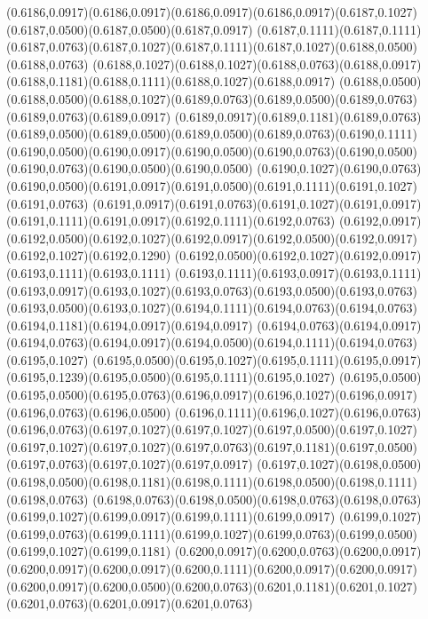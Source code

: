 (0.6186,0.0917)(0.6186,0.0917)(0.6186,0.0917)(0.6186,0.0917)(0.6187,0.1027)(0.6187,0.0500)(0.6187,0.0500)(0.6187,0.0917)
(0.6187,0.1111)(0.6187,0.1111)(0.6187,0.0763)(0.6187,0.1027)(0.6187,0.1111)(0.6187,0.1027)(0.6188,0.0500)(0.6188,0.0763)
(0.6188,0.1027)(0.6188,0.1027)(0.6188,0.0763)(0.6188,0.0917)(0.6188,0.1181)(0.6188,0.1111)(0.6188,0.1027)(0.6188,0.0917)
(0.6188,0.0500)(0.6188,0.0500)(0.6188,0.1027)(0.6189,0.0763)(0.6189,0.0500)(0.6189,0.0763)(0.6189,0.0763)(0.6189,0.0917)
(0.6189,0.0917)(0.6189,0.1181)(0.6189,0.0763)(0.6189,0.0500)(0.6189,0.0500)(0.6189,0.0500)(0.6189,0.0763)(0.6190,0.1111)
(0.6190,0.0500)(0.6190,0.0917)(0.6190,0.0500)(0.6190,0.0763)(0.6190,0.0500)(0.6190,0.0763)(0.6190,0.0500)(0.6190,0.0500)
(0.6190,0.1027)(0.6190,0.0763)(0.6190,0.0500)(0.6191,0.0917)(0.6191,0.0500)(0.6191,0.1111)(0.6191,0.1027)(0.6191,0.0763)
(0.6191,0.0917)(0.6191,0.0763)(0.6191,0.1027)(0.6191,0.0917)(0.6191,0.1111)(0.6191,0.0917)(0.6192,0.1111)(0.6192,0.0763)
(0.6192,0.0917)(0.6192,0.0500)(0.6192,0.1027)(0.6192,0.0917)(0.6192,0.0500)(0.6192,0.0917)(0.6192,0.1027)(0.6192,0.1290)
(0.6192,0.0500)(0.6192,0.1027)(0.6192,0.0917)(0.6193,0.1111)(0.6193,0.1111)
\PST@Solid(0.6193,0.1111)(0.6193,0.0917)(0.6193,0.1111)(0.6193,0.0917)(0.6193,0.1027)(0.6193,0.0763)(0.6193,0.0500)(0.6193,0.0763)
(0.6193,0.0500)(0.6193,0.1027)(0.6194,0.1111)(0.6194,0.0763)(0.6194,0.0763)(0.6194,0.1181)(0.6194,0.0917)(0.6194,0.0917)
(0.6194,0.0763)(0.6194,0.0917)(0.6194,0.0763)(0.6194,0.0917)(0.6194,0.0500)(0.6194,0.1111)(0.6194,0.0763)(0.6195,0.1027)
(0.6195,0.0500)(0.6195,0.1027)(0.6195,0.1111)(0.6195,0.0917)(0.6195,0.1239)(0.6195,0.0500)(0.6195,0.1111)(0.6195,0.1027)
(0.6195,0.0500)(0.6195,0.0500)(0.6195,0.0763)(0.6196,0.0917)(0.6196,0.1027)(0.6196,0.0917)(0.6196,0.0763)(0.6196,0.0500)
(0.6196,0.1111)(0.6196,0.1027)(0.6196,0.0763)(0.6196,0.0763)(0.6197,0.1027)(0.6197,0.1027)(0.6197,0.0500)(0.6197,0.1027)
(0.6197,0.1027)(0.6197,0.1027)(0.6197,0.0763)(0.6197,0.1181)(0.6197,0.0500)(0.6197,0.0763)(0.6197,0.1027)(0.6197,0.0917)
(0.6197,0.1027)(0.6198,0.0500)(0.6198,0.0500)(0.6198,0.1181)(0.6198,0.1111)(0.6198,0.0500)(0.6198,0.1111)(0.6198,0.0763)
(0.6198,0.0763)(0.6198,0.0500)(0.6198,0.0763)(0.6198,0.0763)(0.6199,0.1027)(0.6199,0.0917)(0.6199,0.1111)(0.6199,0.0917)
(0.6199,0.1027)(0.6199,0.0763)(0.6199,0.1111)(0.6199,0.1027)(0.6199,0.0763)(0.6199,0.0500)(0.6199,0.1027)(0.6199,0.1181)
(0.6200,0.0917)(0.6200,0.0763)(0.6200,0.0917)(0.6200,0.0917)(0.6200,0.0917)(0.6200,0.1111)(0.6200,0.0917)(0.6200,0.0917)
(0.6200,0.0917)(0.6200,0.0500)(0.6200,0.0763)(0.6201,0.1181)(0.6201,0.1027)(0.6201,0.0763)(0.6201,0.0917)(0.6201,0.0763)
